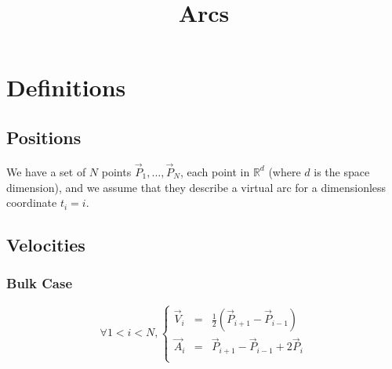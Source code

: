 \documentclass[aps,12pt]{revtex4}
\begin{document}
\title{Arcs}
\maketitle
	
\section{Definitions}

\subsection{Positions}
We have a set of $N$ points $\vec{P}_1,\ldots,\vec{P}_N$, each point in $\mathbb{R}^d$ (where $d$ is the space dimension), and we assume
that they describe a virtual arc for a dimensionless coordinate $t_i=i$.

\subsection{Velocities}

\subsubsection{Bulk Case}

\begin{equation}
	\forall 1<i<N,
	\left\lbrace
	\begin{array}{rcl}
	\vec{V}_i & = & \frac{1}{2}\left(\vec{P}_{i+1} - \vec{P}_{i-1}\right)\\
	\vec{A}_i & = &  \vec{P}_{i+1} - \vec{P}_{i-1} + 2\vec{P}_i\\
	\end{array}
	\right.
\end{equation}
\end{document}
